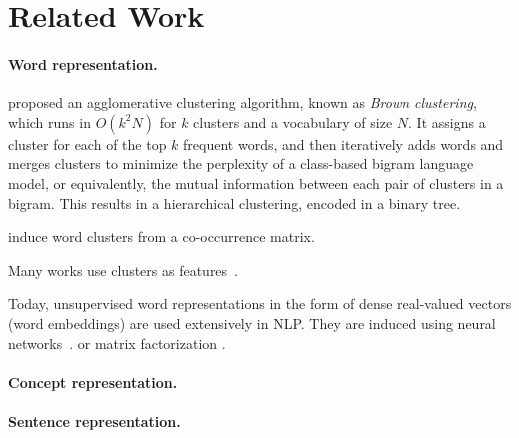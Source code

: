 \documentclass{article}
\begin{document}
    \section{Related Work}\label{sec:related_work}

    \paragraph{Word representation.}
    \citet{brown1992class} proposed an agglomerative clustering algorithm,
    known as \textit{Brown clustering},
    which runs in $O(k^2N)$ for $k$ clusters and a vocabulary of size $N$.
    It assigns a cluster for each of the top $k$ frequent words,
    and then iteratively adds words and merges clusters to minimize the
    perplexity of a class-based bigram language model,
    or equivalently, the mutual information between each pair of clusters in a bigram.
    This results in a hierarchical clustering, encoded in a binary tree.

    \citet{pereira1993distributional} induce word clusters from a co-occurrence matrix.

    Many works use clusters as features~\cite{miller2004name,koo2008simple,huang2009distributional,zhao2009multilingual}.

    Today, unsupervised word representations in the form of dense real-valued vectors
    (word embeddings) are used extensively in NLP.
    They are induced using neural networks~\cite{bengio2003neural,mnih2007three,collobert2008unified,turian2010word,mikolov2013efficient}.
    or matrix factorization \cite{pennington2014glove}.

    \paragraph{Concept representation.}


    \paragraph{Sentence representation.}


    
    
\end{document}
